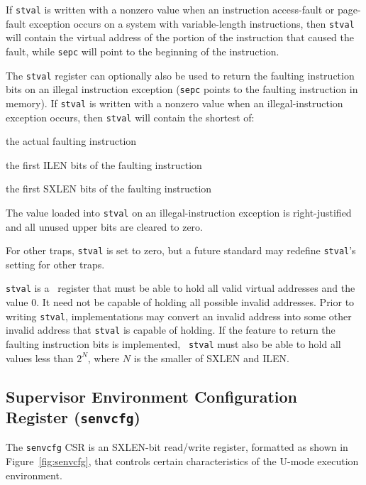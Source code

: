 If {\tt stval} is written with a nonzero value when an instruction access-fault
or page-fault exception occurs on a system with variable-length instructions,
then {\tt stval} will contain the virtual address of the portion of the
instruction that caused the fault, while {\tt sepc} will point to the beginning
of the instruction.

The {\tt stval} register can optionally also be used to return the faulting
instruction bits on an illegal instruction exception ({\tt sepc} points to the
faulting instruction in memory).
If {\tt stval} is written with a nonzero value when an illegal-instruction
exception occurs, then {\tt stval} will contain the shortest of:
\begin{compactitem}
\item the actual faulting instruction
\item the first ILEN bits of the faulting instruction
\item the first SXLEN bits of the faulting instruction
\end{compactitem}
The value loaded into {\tt stval} on an illegal-instruction exception is
right-justified and all unused upper bits are cleared to zero.

For other traps, {\tt stval} is set to zero, but a future standard may
redefine {\tt stval}'s setting for other traps.

{\tt stval} is a \warl\ register that must be able to hold all valid
virtual addresses and the value 0.  It need not be capable of holding all
possible invalid addresses.
Prior to writing {\tt stval}, implementations may convert an invalid address
into some other invalid address that {\tt stval} is capable of holding.
If the feature to return the faulting instruction bits is implemented, {\tt
stval} must also be able to hold all values less than $2^N$, where $N$ is the
smaller of SXLEN and ILEN.

\subsection{Supervisor Environment Configuration Register ({\tt senvcfg})}

The {\tt senvcfg} CSR is an SXLEN-bit read/write register,
formatted as shown in Figure~\ref{fig:senvcfg},
that controls certain characteristics of the U-mode execution environment.


